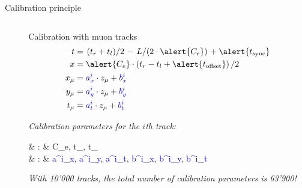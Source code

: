 \documentclass[compress, 13pt, aspectratio=169]{beamer}
\newcommand{\slfrac}[2]{\left.#1\middle/#2\right.}
\begin{document}
\begin{frame}[fragile,t]{Calibration principle}
\begin{columns}[t]
\begin{column}{0.45 \textwidth}
{			}
		\end{column}
		\pause
		\begin{column}{0.48 \textwidth}
			\begin{block}{Calibration with muon tracks}
				\vspace*{-1.5em}
				\begin{align}
					\small
					t     & = \slfrac{(t_r + t_l)}{2} - \slfrac{L}{(2 \cdot \alert{C_e})} + \alert{t_\text{sync}} \\
					x     & = \alert{C_e}\cdot \left( t_r - t_l  + \alert{t_\text{offset}} \right) / 2            \\
					x_\mu & = \textcolor{blue}{a^i_x} \cdot z_\mu  + \textcolor{blue}{b^i_x}                      \\
					y_\mu & = \textcolor{blue}{a^i_y} \cdot z_\mu  + \textcolor{blue}{b^i_y}                      \\
					t_\mu & = \textcolor{blue}{a^i_t} \cdot z_\mu  + \textcolor{blue}{b^i_t}
				\end{align}
			\end{block}
			\textit{Calibration parameters for the $i$th track:}
			\vspace{-2em}

			\begin{flalign*}
				 & :          & \alert{C_e}, \alert{t_}, \alert{t_}                                                                                          \\
				 & \text{\textit{\textcolor{blue}{local parameters}}}: & \textcolor{blue}{a^i_x}, \textcolor{blue}{a^i_y}, \textcolor{blue}{a^i_t}, \textcolor{blue}{b^i_x}, \textcolor{blue}{b^i_y}, \textcolor{blue}{b^i_t}
			\end{flalign*}

			\pause
			\vspace*{1em}
			\textit{With 10'000 tracks, the total number of calibration parameters is \alert{\huge 63'900!}}
		\end{column}

	\end{columns}
\end{frame}
\end{document}
